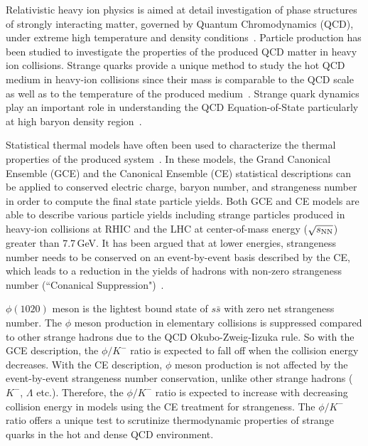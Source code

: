 \documentclass[%
 reprint,	
showpacs,
 amsmath,amssymb,
 aps,
 prc,
]{revtex4-1}
\begin{document}
\maketitle


Relativistic heavy ion physics is aimed at detail investigation of phase structures of strongly interacting matter, governed by Quantum Chromodynamics (QCD), under extreme high temperature and density conditions~\cite{akiba2015hot,StarWhitePaper}. Particle production has been studied to investigate the properties of the produced QCD matter in heavy ion collisions. Strange quarks provide a unique method to study the hot QCD medium in heavy-ion collisions since their mass is comparable to the QCD scale as well as to the temperature of the produced medium~\cite{Rafelski:1982pu,Koch:1986ud}. Strange quark dynamics play an important role in understanding the QCD Equation-of-State particularly at high baryon density region~\cite{KO.PhysRevLett.55.2661,Danielewicz1592}. 

Statistical thermal models have often been used to characterize the thermal properties of the produced system~\cite{BraunMunzinger:2003zd,Redlich_CE}. In these models, the Grand Canonical Ensemble (GCE) and the Canonical Ensemble (CE) statistical descriptions can be applied to conserved electric charge, baryon number, and strangeness number in order to compute the final state particle yields. Both GCE and CE models are able to describe various particle yields including strange particles produced in heavy-ion collisions at RHIC and the LHC at center-of-mass energy ($\sqrt{s_{\rm NN}}$) greater than 7.7\,GeV. It has been argued that at lower energies, strangeness number needs to be conserved on an event-by-event basis described by the CE, which leads to a reduction in the yields of hadrons with non-zero strangeness number (``Conanical Suppression")~\cite{Redlich:2001kb}.

$\phi(1020)$ meson is the lightest bound state of $s\bar{s}$ with zero net strangeness number. The $\phi$ meson production in elementary collisions is suppressed compared to other strange hadrons due to the QCD Okubo-Zweig-Iizuka rule. So with the GCE description, the $\phi/K^-$ ratio is expected to fall off when the collision energy decreases. With the CE description, $\phi$ meson production is not affected by the event-by-event strangeness number conservation, unlike other strange hadrons ($K^-$, $\Lambda$ etc.). Therefore, the $\phi/K^-$ ratio is expected to increase with decreasing collision energy in models using the CE treatment for strangeness. The $\phi/K^-$ ratio offers a unique test to scrutinize thermodynamic properties of strange quarks in the hot and dense QCD environment.
\end{document}
